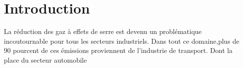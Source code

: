 \documentclass[14pt]{extarticle}
\begin{document}
\newpage
{}
\begingroup
\hypersetup{linkcolor=black}
\tableofcontents
\newpage
\listoffigures
\endgroup
\newpage
\listoftables




\newpage
{}
\setcounter{page}{1}
\section{Introduction}
La réduction des gaz à effets de serre est devenu un problématique incoutournable pour tous les secteurs industriels. Dans tout ce domaine,plus de 90 pourcent de ces émissions proviennent  de l'industrie de transport. Dont la place du secteur automobile 

\end{document}
